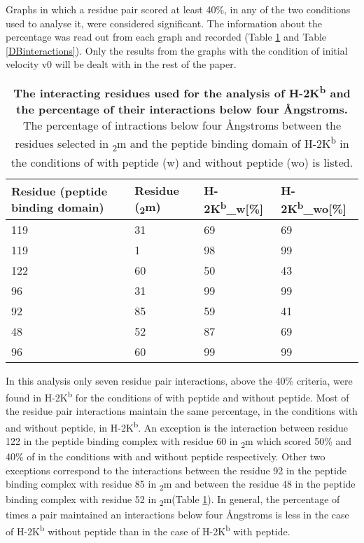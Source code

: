 \documentclass[11pt,twocolumn]{article}
\newcommand{\kb}{H-2K\textsuperscript{b}\xspace}
\newcommand{\kbw}{H-2K\textsuperscript{b}\_w\xspace}
\newcommand{\kbwo}{H-2K\textsuperscript{b}\_wo\xspace}
\newcommand{\angstr}{{\AA}ngstroms\xspace}
\newcommand{\btm}{\textbeta\textsubscript{2}m\xspace}
\begin{document}
Graphs in which a residue pair scored at least 40\%, in any of the two
conditions used to analyse it,  were considered significant. The information
about the percentage was read out from each graph and recorded (Table
\ref{KBinteractions} and Table \ref{DBinteractions}). Only the results from the
graphs with the condition of initial velocity v0 will be dealt with in the rest
of the paper.


\begin{table}[H]
\caption{\textbf{The interacting residues used for the analysis of \kb and the
percentage of their interactions below four \angstr. } The percentage of
intractions below four \angstr between the residues selected in \btm and the
peptide binding domain of \kb in the conditions of with peptide (w) and without
peptide (wo) is listed.}
\label{KBinteractions}
\begin{tabularx}{\linewidth}{|X|X|X|X|}  \hline
Residue (peptide binding domain) &Residue (\btm)&\kbw [\%]&\kbwo [\%]\\ \hline
119&31&69&69\\ \hline
119&1&98&99\\ \hline
122&60&50&43\\ \hline
96&31&99&99\\ \hline
92&85&59&41\\ \hline
48&52&87&69\\ \hline
96&60&99&99\\ \hline
\end{tabularx}
\end{table}

In this analysis only seven residue pair interactions, above the 40\% criteria,
were found in \kb for the conditions of with peptide  and without peptide. Most
of the residue pair interactions maintain the same percentage, in  the
conditions with and without peptide, in  \kb. An exception is the interaction
between  residue 122 in the peptide binding complex with residue 60 in \btm
which scored 50\% and 40\% of in the conditions with and without peptide
respectively. Other two exceptions correspond to the interactions between the
residue 92  in the peptide binding complex with residue 85 in \btm and between
the residue 48 in the peptide binding complex with residue 52 in \btm (Table
\ref{KBinteractions}). In general, the percentage of times a pair maintained an
interactions below four \angstr is less in the case of \kb without peptide than
in the case of \kb with peptide.  
\end{document}
